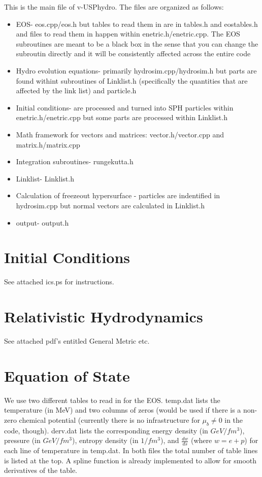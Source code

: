 \documentclass[article]{revtex4-1}
\begin{document}
This is the main file of v-USPhydro.  The files are organized as follows:
\begin{itemize}
\item EOS- eos.cpp/eos.h but tables to read them in are in tables.h and eostables.h and files to read them in happen within enetric.h/enetric.cpp.  The EOS subroutines are meant to be a black box in the sense that you can change the subroutin directly and it will be consistently affected across the entire code
\item Hydro evolution equations- primarily hydrosim.cpp/hydrosim.h but parts are found withint subroutines of Linklist.h (specifically the quantities that are affected by the link list) and particle.h
\item Initial conditions- are processed and turned into SPH particles within enetric.h/enetric.cpp but some parts are processed within Linklist.h
\item Math framework for vectors and matrices: vector.h/vector.cpp and matrix.h/matrix.cpp
\item Integration subroutines- rungekutta.h
\item Linklist- Linklist.h
\item Calculation of freezeout hypersurface - particles are indentified in hydrosim.cpp but normal vectors are calculated in Linklist.h
\item output- output.h
\end{itemize}

\section{Initial Conditions}\label{sec:ics}

See attached ics.ps for instructions.

\section{Relativistic Hydrodynamics}\label{sec:hydro}

See attached pdf's entitled General Metric etc. 

\section{Equation of State}\label{sec:eos}

We use two different tables to read in for the EOS.  temp.dat lists the temperature (in MeV) and two columns of zeros (would be used if there is a non-zero chemical potential (currently there is no infrastructure for $\mu_b\neq 0 $ in the code, though).  derv.dat lists the corresponding energy density  (in $GeV/fm^3$), pressure  (in $GeV/fm^3$),  entropy density (in $1/fm^3$),  and $\frac{dw}{ds}$ (where $w=e+p$) for each line of temperature in temp.dat.  In both files the total number of table lines is listed at the top.   A spline function is already implemented to allow for smooth derivatives of the table.
\end{document}

